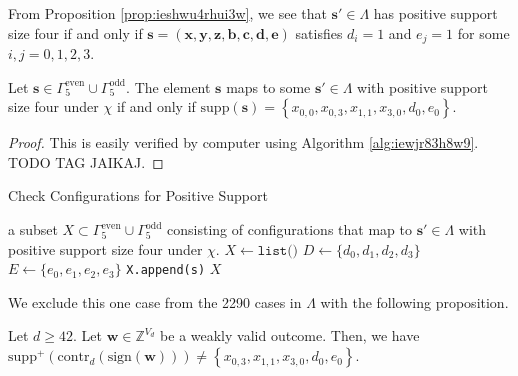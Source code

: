 \begin{corollary}
    From Proposition \ref{prop:ieshwu4rhui3w}, we see that \( \mathbf{s}' \in \Lambda \) has positive support size four if and only if \( \mathbf{s} = (\mathbf{x}, \mathbf{y}, \mathbf{z}, \mathbf{b}, \mathbf{c}, \mathbf{d}, \mathbf{e}) \) satisfies \( d_i = 1 \) and \( e_j = 1 \) for some \( i,j = 0, 1,2,3 \).
\end{corollary}

\begin{corollary}
    Let \( \mathbf{s} \in \Gamma^{\mathrm{even}}_5 \cup \Gamma^{\mathrm{odd}}_5 \). The element \( \mathbf{s} \) maps to some \( \mathbf{s}' \in \Lambda \) with positive support size four under \( \chi \) if and only if \( \mathrm{supp}(\mathbf{s}) = \left\{ x_{0,0}, x_{0,3}, x_{1,1}, x_{3,0}, d_0, e_0 \right\} \).
\end{corollary}

\begin{proof}
    This is easily verified by computer using Algorithm \ref{alg:iewjr83h8w9}. TODO TAG JAIKAJ.
\end{proof}

\begin{algorithm}
    \caption{Check Configurations for Positive Support}
    \label{alg:iewjr83h8w9}
    \begin{algorithmic}[1]
    \Ensure a subset \( X \subset \Gamma^{\mathrm{even}}_5 \cup \Gamma^{\mathrm{odd}}_5 \) consisting of configurations that map to \( \mathbf{s}' \in \Lambda \) with positive support size four under \( \chi \).
    \State $X \gets \texttt{list()}$
    \State $D \gets \{d_0, d_1, d_2, d_3\}$
    \State $E \gets \{e_0, e_1, e_2, e_3\}$
            \State \texttt{X.append(s)}
        \EndIf
    \EndFor
    \State \Return \( X \)
\end{algorithmic}
\end{algorithm}

We exclude this one case from the 2290 cases in \( \Lambda \) with the following proposition.

\begin{proposition}
    Let \( d \geq 42 \). Let \( \mathbf{w} \in \mathbb{Z}^{V_d} \) be a weakly valid outcome. Then, we have \( \mathrm{supp}^+(\mathrm{contr}_d(\mathrm{sign}(\mathbf{w}))) \neq \left\{ x_{0,3}, x_{1,1}, x_{3,0}, d_0, e_0 \right\}  \).
\end{proposition}

